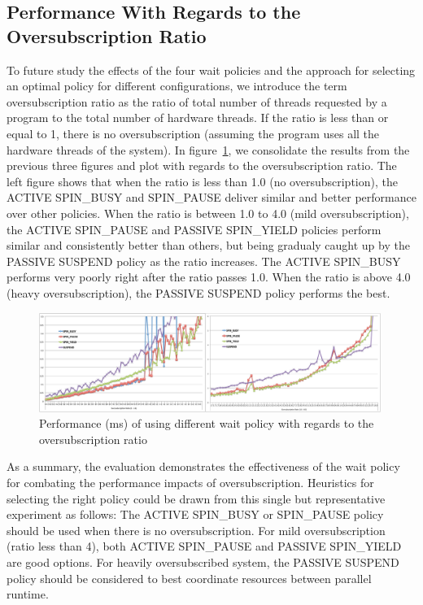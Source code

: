 \subsection{Performance With Regards to the Oversubscription Ratio}
To future study the effects of the four wait policies and the approach for selecting an optimal policy for different
configurations, we introduce the term oversubscription ratio as the ratio of total number of
threads requested by a program to the total number of hardware threads. If the ratio is less than or equal to 1,
there is no oversubscription (assuming the program uses all the hardware threads of the system). 
In figure~\ref{fig:ovratio}, we consolidate the results from the previous three figures and plot with regards to 
the oversubscription ratio. The left figure shows that when the ratio is less than 1.0 (no oversubscription), 
the {\sf ACTIVE} {\sf SPIN\_BUSY} and {\sf SPIN\_PAUSE} 
deliver similar and better performance over other policies. 
When the ratio is between 1.0 to 4.0 (mild oversubscription), the {\sf ACTIVE SPIN\_PAUSE} and {\sf PASSIVE SPIN\_YIELD} policies 
perform similar and consistently better than others, but being gradualy caught up by the {\sf PASSIVE SUSPEND} policy as the ratio increases. 
The {\sf ACTIVE SPIN\_BUSY} performs very poorly right after the ratio passes 1.0. 
When the ratio is above 4.0 (heavy oversubscription), the {\sf PASSIVE SUSPEND} policy performs the best. 
\begin{figure}[h]
    \includegraphics[width=0.99\textwidth] {images/ovratio}
    \caption{Performance (ms) of using different wait policy with regards to the oversubscription ratio}
    \label{fig:ovratio}
\end{figure}

As a summary, the evaluation demonstrates the effectiveness of the wait policy for combating the performance 
impacts of oversubscription. Heuristics for selecting the right policy 
could be drawn from this single but representative experiment as follows:
The {\sf ACTIVE SPIN\_BUSY} or {SPIN\_PAUSE} policy should be used when there is no oversubscription. 
For mild oversubscription (ratio less than 4), both {\sf ACTIVE SPIN\_PAUSE} and {\sf PASSIVE SPIN\_YIELD} are good options. 
For heavily oversubscribed system, the {\sf PASSIVE SUSPEND} policy should be 
considered to best coordinate resources between parallel runtime. 

